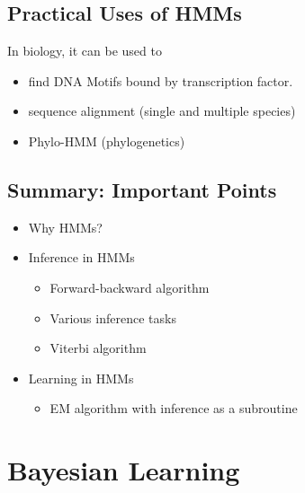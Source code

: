 \documentclass[10pt]{article}
\begin{document}
\subsection*{Practical Uses of HMMs}
In biology, it can be used to 
\begin{itemize}
	\item find DNA Motifs bound by transcription factor.
	\item sequence alignment (single and multiple species)
	\item Phylo-HMM (phylogenetics)
\end{itemize}

\subsection*{Summary: Important Points}
\begin{itemize}
	\item Why HMMs?
	\item Inference in HMMs
	\begin{itemize}
	    \item Forward-backward algorithm
	    \item Various inference tasks
	    \item Viterbi algorithm
    \end{itemize}
	\item Learning in HMMs
	\begin{itemize}
	    \item EM algorithm with inference as a subroutine
    \end{itemize}
\end{itemize}

\section*{Bayesian Learning}
\end{document}
